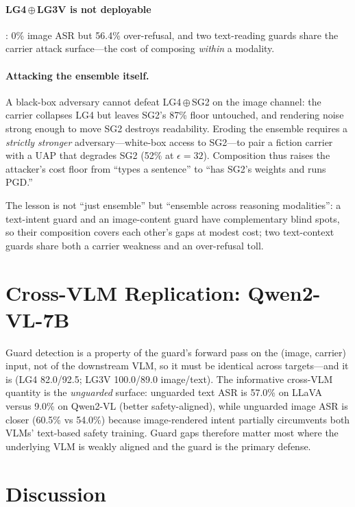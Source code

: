 \documentclass[11pt]{article}
\newcommand{\ens}{\ensuremath{\oplus}}    %
\begin{document}
\paragraph{LG4\,\ens\,LG3V is not deployable}: 0\% image ASR but 56.4\% over-refusal, and two text-reading guards share the carrier attack surface---the cost of composing \emph{within} a modality.

\paragraph{Attacking the ensemble itself.} A black-box adversary cannot defeat LG4\,\ens\,SG2 on the image channel: the carrier collapses LG4 but leaves SG2's 87\% floor untouched, and rendering noise strong enough to move SG2 destroys readability. Eroding the ensemble requires a \emph{strictly stronger} adversary---white-box access to SG2---to pair a fiction carrier with a UAP that degrades SG2 (52\% at $\epsilon{=}32$). Composition thus raises the attacker's cost floor from ``types a sentence'' to ``has SG2's weights and runs PGD.''

The lesson is not ``just ensemble'' but ``ensemble across reasoning modalities'': a text-intent guard and an image-content guard have complementary blind spots, so their composition covers each other's gaps at modest cost; two text-context guards share both a carrier weakness and an over-refusal toll.

\section{Cross-VLM Replication: Qwen2-VL-7B}
\label{sec:crossvlm}

Guard detection is a property of the guard's forward pass on the (image, carrier) input, not of the downstream VLM, so it must be identical across targets---and it is (LG4 82.0/92.5; LG3V 100.0/89.0 image/text). The informative cross-VLM quantity is the \emph{unguarded} surface: unguarded text ASR is 57.0\% on LLaVA versus 9.0\% on Qwen2-VL (better safety-aligned), while unguarded image ASR is closer (60.5\% vs 54.0\%) because image-rendered intent partially circumvents both VLMs' text-based safety training. Guard gaps therefore matter most where the underlying VLM is weakly aligned and the guard is the primary defense.

\section{Discussion}
\end{document}
